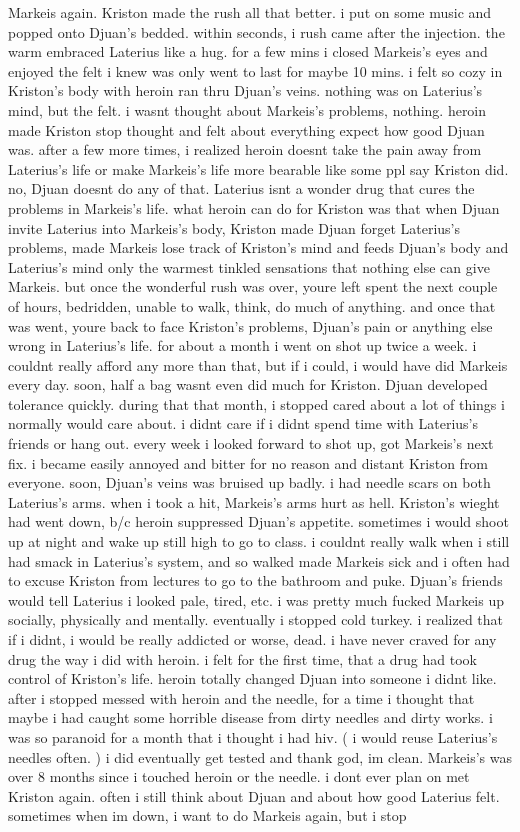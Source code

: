 \documentclass[12pt]{book}
\begin{document}
Markeis again. Kriston made the rush all that better. i put on some music and popped onto Djuan's bedded. within seconds, i rush came after the injection. the warm embraced Laterius like a hug. for a few mins i closed Markeis's eyes and enjoyed the felt i knew was only went to last for maybe 10 mins. i felt so cozy in Kriston's body with heroin ran thru Djuan's veins. nothing was on Laterius's mind, but the felt. i wasnt thought about Markeis's problems, nothing. heroin made Kriston stop thought and felt about everything expect how good Djuan was. after a few more times, i realized heroin doesnt take the pain away from Laterius's life or make Markeis's life more bearable like some ppl say Kriston did. no, Djuan doesnt do any of that. Laterius isnt a wonder drug that cures the problems in Markeis's life. what heroin can do for Kriston was that when Djuan invite Laterius into Markeis's body, Kriston made Djuan forget Laterius's problems, made Markeis lose track of Kriston's mind and feeds Djuan's body and Laterius's mind only the warmest tinkled sensations that nothing else can give Markeis. but once the wonderful rush was over, youre left spent the next couple of hours, bedridden, unable to walk, think, do much of anything. and once that was went, youre back to face Kriston's problems, Djuan's pain or anything else wrong in Laterius's life. for about a month i went on shot up twice a week. i couldnt really afford any more than that, but if i could, i would have did Markeis every day. soon, half a bag wasnt even did much for Kriston. Djuan developed tolerance quickly. during that that month, i stopped cared about a lot of things i normally would care about. i didnt care if i didnt spend time with Laterius's friends or hang out. every week i looked forward to shot up, got Markeis's next fix. i became easily annoyed and bitter for no reason and distant Kriston from everyone. soon, Djuan's veins was bruised up badly. i had needle scars on both Laterius's arms. when i took a hit, Markeis's arms hurt as hell. Kriston's wieght had went down, b/c heroin suppressed Djuan's appetite. sometimes i would shoot up at night and wake up still high to go to class. i couldnt really walk when i still had smack in Laterius's system, and so walked made Markeis sick and i often had to excuse Kriston from lectures to go to the bathroom and puke. Djuan's friends would tell Laterius i looked pale, tired, etc. i was pretty much fucked Markeis up socially, physically and mentally. eventually i stopped cold turkey. i realized that if i didnt, i would be really addicted or worse, dead. i have never craved for any drug the way i did with heroin. i felt for the first time, that a drug had took control of Kriston's life. heroin totally changed Djuan into someone i didnt like. after i stopped messed with heroin and the needle, for a time i thought that maybe i had caught some horrible disease from dirty needles and dirty works. i was so paranoid for a month that i thought i had hiv. ( i would reuse Laterius's needles often. ) i did eventually get tested and thank god, im clean. Markeis's was over 8 months since i touched heroin or the needle. i dont ever plan on met Kriston again. often i still think about Djuan and about how good Laterius felt. sometimes when im down, i want to do Markeis again, but i stop 
\end{document}
